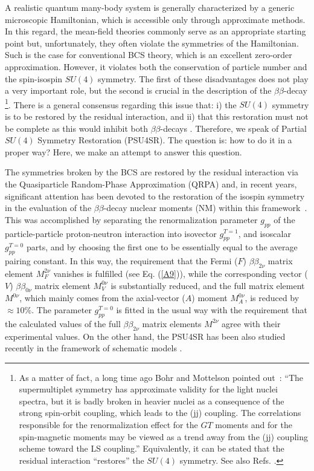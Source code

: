 \documentclass[nofootinbib,twocolumn,eqsecnum,floats,aps]{revtex4}
\def\rf#1{{(\ref{#1})}}
\begin{document}
A realistic quantum many-body system is generally characterized by
a generic microscopic Hamiltonian, which is accessible only
through approximate methods. In this regard, the mean-field
theories commonly serve as an appropriate starting point but,
unfortunately, they often violate the symmetries of the
Hamiltonian. Such is the case for conventional BCS theory, which is
an excellent zero-order approximation. However,  it violates both
the conservation of particle number and the spin-isospin $SU(4)$
symmetry. The first of these disadvantages does not play a very
important role, but the second is crucial in the description of
the $\beta\beta$-decay
\footnote{ As a matter of fact,  a long time ago Bohr and Mottelson pointed
out~\cite{Boh69}:
``The supermultiplet symmetry has approximate validity for the light
nuclei spectra,  but it is badly broken in heavier nuclei as a
consequence of the strong spin-orbit coupling, which leads to the
(jj) coupling. The correlations responsible for the renormalization effect
for the $GT$ moments and for the
spin-magnetic moments  may be viewed as a trend away from the (jj)
coupling scheme toward the LS coupling.''
Equivalently, it  can be stated that  the residual interaction ``restores''
the $SU(4)$ symmetry. See also Refs. \cite{Vog92,Lut15}.}.
There is a general consensus regarding this issue
that: i) the  $SU(4)$ symmetry  is to be restored by the residual interaction,
and ii) that this restoration must not be complete as this
would inhibit both $\beta\beta$-decays \cite{Ber90}. Therefore, we speak of
Partial $SU(4)$ Symmetry  Restoration (PSU4SR). %
The question is: how to do it in a proper way?
Here, we make an attempt to answer this question.

The symmetries broken by the BCS are restored  by the residual
interaction via the Quasiparticle Random-Phase Approximation
(QRPA) and, in recent years, significant attention has been
devoted to the restoration of the isospin symmetry  in the evaluation
of the $\beta\beta$-decay  nuclear moments (NM)
within  this framework~\cite{Sim13,Don15,Hyv15}.  This was accomplished by
separating the renormalization parameter $g_{pp}$ of the
particle-particle proton-neutron interaction into isovector
$g^{T=1}_{pp}$, and isoscalar $g^{T=0}_{pp}$ parts, and by
choosing the first one to be essentially equal to the average pairing constant.
In this
way, the requirement that the Fermi ($F$)
$\beta\beta_{2\nu}$  matrix element $M_F^{2\nu}$
vanishes  is  fulfilled (see Eq. \rf{A9}), while the corresponding
vector ($V$) $\beta\beta_{0\nu}$ matrix element $M_V^{0\nu}$ is substantially reduced,
and the full matrix element $M^{0\nu}$, which mainly comes from
the axial-vector ($A$) moment $M_{A}^{0\nu}$,  is reduced by $\approx 10 \%$.
The parameter $g^{T=0}_{pp}$ is fitted in the usual way
with the requirement that the calculated values of the full ${\beta\beta}_{2\nu}$
matrix elements $M^{2\nu}$ agree with their experimental values.
On the other hand, the PSU4SR %
has been also studied recently
in the framework of schematic models \cite{Ste15,Unl15}.
\end{document}
